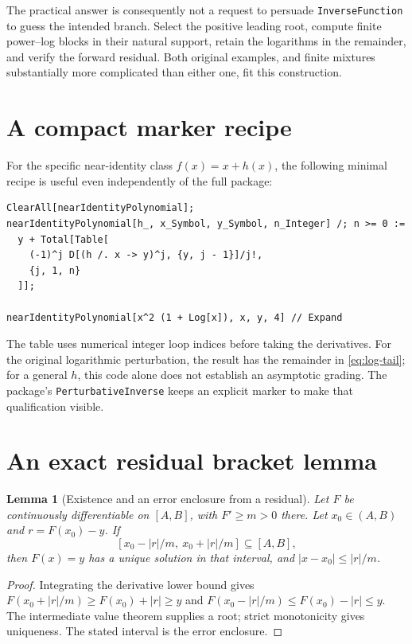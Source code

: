 \documentclass[11pt,a4paper]{article}
\numberwithin{equation}{section}
\newtheorem{lemma}[theorem]{Lemma}
\theoremstyle{definition}
\theoremstyle{remark}
\begin{document}
The practical answer is consequently not a request to persuade
\texttt{InverseFunction} to guess the intended branch. Select the positive
leading root, compute finite power--log blocks in their natural support,
retain the logarithms in the remainder, and verify the forward residual.
Both original examples, and finite mixtures substantially more complicated
than either one, fit this construction.

\appendix
\section{A compact marker recipe}

For the specific near-identity class $f(x)=x+h(x)$, the following minimal
recipe is useful even independently of the full package:
\begin{lstlisting}
ClearAll[nearIdentityPolynomial];
nearIdentityPolynomial[h_, x_Symbol, y_Symbol, n_Integer] /; n >= 0 :=
  y + Total[Table[
    (-1)^j D[(h /. x -> y)^j, {y, j - 1}]/j!,
    {j, 1, n}
  ]];

nearIdentityPolynomial[x^2 (1 + Log[x]), x, y, 4] // Expand
\end{lstlisting}
The table uses numerical integer loop indices before taking the derivatives.
For the original logarithmic perturbation, the result has the remainder in
\eqref{eq:log-tail}; for a general $h$, this code alone does not establish
an asymptotic grading. The package's \texttt{PerturbativeInverse} keeps an
explicit marker to make that qualification visible.

\section{An exact residual bracket lemma}

\begin{lemma}[Existence and an error enclosure from a residual]
Let $F$ be continuously differentiable on $[A,B]$, with $F'\ge m>0$ there.
Let $x_0\in(A,B)$ and $r=F(x_0)-y$. If
\[
 [x_0-|r|/m,\ x_0+|r|/m]\subseteq[A,B],
\]
then $F(x)=y$ has a unique solution in that interval, and
$|x-x_0|\le |r|/m$.
\end{lemma}
\begin{proof}
Integrating the derivative lower bound gives
$F(x_0+|r|/m)\ge F(x_0)+|r|\ge y$ and
$F(x_0-|r|/m)\le F(x_0)-|r|\le y$.
The intermediate value theorem supplies a root; strict monotonicity gives
uniqueness. The stated interval is the error enclosure.
\end{proof}
\end{document}
